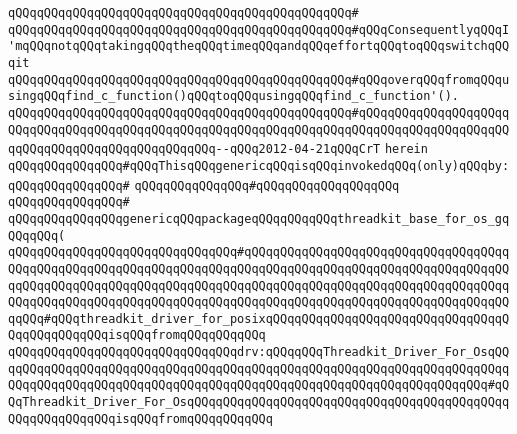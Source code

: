 \verb|qQQqqQQqqQQqqQQqqQQqqQQqqQQqqQQqqQQqqQQqqQQqqQQq#|\newline
\verb|qQQqqQQqqQQqqQQqqQQqqQQqqQQqqQQqqQQqqQQqqQQqqQQq#qQQqConsequentlyqQQqI'mqQQqnotqQQqtakingqQQqtheqQQqtimeqQQqandqQQqeffortqQQqtoqQQqswitchqQQqit|\newline
\verb|qQQqqQQqqQQqqQQqqQQqqQQqqQQqqQQqqQQqqQQqqQQqqQQq#qQQqoverqQQqfromqQQqusingqQQqfind_c_function()qQQqtoqQQqusingqQQqfind_c_function'().|\newline
\verb|qQQqqQQqqQQqqQQqqQQqqQQqqQQqqQQqqQQqqQQqqQQqqQQq#qQQqqQQqqQQqqQQqqQQqqQQqqQQqqQQqqQQqqQQqqQQqqQQqqQQqqQQqqQQqqQQqqQQqqQQqqQQqqQQqqQQqqQQqqQQqqQQqqQQqqQQqqQQqqQQqqQQqqQQq--qQQq2012-04-21qQQqCrT|\newline
\verb|herein|\newline
\newline
\verb|qQQqqQQqqQQqqQQq#qQQqThisqQQqgenericqQQqisqQQqinvokedqQQq(only)qQQqby:|\newline
\verb|qQQqqQQqqQQqqQQq#|\newline
\verb|qQQqqQQqqQQqqQQq#qQQqqQQqqQQqqQQqqQQq|\newline
\verb|qQQqqQQqqQQqqQQq#|\newline
\verb|qQQqqQQqqQQqqQQqgenericqQQqpackageqQQqqQQqqQQqthreadkit_base_for_os_gqQQqqQQq(|\newline
\verb|qQQqqQQqqQQqqQQqqQQqqQQqqQQqqQQq#qQQqqQQqqQQqqQQqqQQqqQQqqQQqqQQqqQQqqQQqqQQqqQQqqQQqqQQqqQQqqQQqqQQqqQQqqQQqqQQqqQQqqQQqqQQqqQQqqQQqqQQqqQQqqQQqqQQqqQQqqQQqqQQqqQQqqQQqqQQqqQQqqQQqqQQqqQQqqQQqqQQqqQQqqQQqqQQqqQQqqQQqqQQqqQQqqQQqqQQqqQQqqQQqqQQqqQQqqQQqqQQqqQQqqQQqqQQqqQQqqQQqqQQqqQQq#qQQqthreadkit_driver_for_posixqQQqqQQqqQQqqQQqqQQqqQQqqQQqqQQqqQQqqQQqqQQqqQQqisqQQqfromqQQqqQQqqQQq|\newline
\verb|qQQqqQQqqQQqqQQqqQQqqQQqqQQqqQQqdrv:qQQqqQQqThreadkit_Driver_For_OsqQQqqQQqqQQqqQQqqQQqqQQqqQQqqQQqqQQqqQQqqQQqqQQqqQQqqQQqqQQqqQQqqQQqqQQqqQQqqQQqqQQqqQQqqQQqqQQqqQQqqQQqqQQqqQQqqQQqqQQqqQQqqQQqqQQqqQQqqQQq#qQQqThreadkit_Driver_For_OsqQQqqQQqqQQqqQQqqQQqqQQqqQQqqQQqqQQqqQQqqQQqqQQqqQQqqQQqqQQqisqQQqfromqQQqqQQqqQQq|\newline
